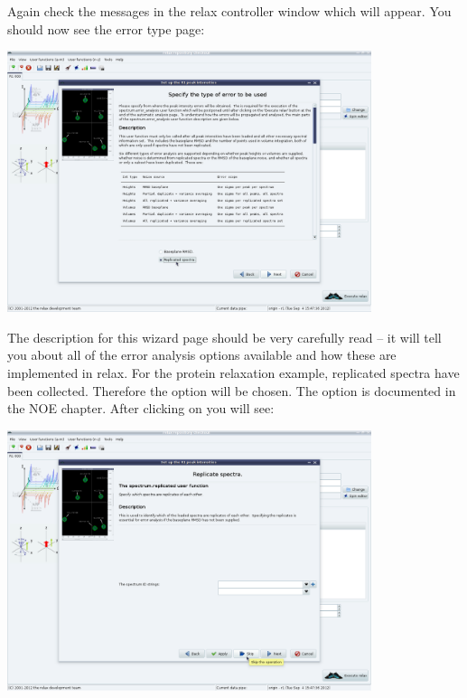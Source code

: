 Again check the messages in the relax controller window which will appear.  You should now see the error type page:

\begin{minipage}[h]{\linewidth}
\centerline{\includegraphics[width=0.8\textwidth, bb=14 14 1415 1019]{graphics/screenshots/r1_analysis/peak_intensity_err_type}}
\end{minipage}

The description for this wizard page should be very carefully read -- it will tell you about all of the error analysis options available and how these are implemented in relax.  For the protein relaxation example, replicated spectra have been collected.  Therefore the option  will be chosen.  The  option is documented in the NOE chapter.  After clicking on  you will see:

\begin{minipage}[h]{\linewidth}
\centerline{\includegraphics[width=0.8\textwidth, bb=14 14 1415 1019]{graphics/screenshots/r1_analysis/peak_intensity_replicates1}}
\end{minipage}

